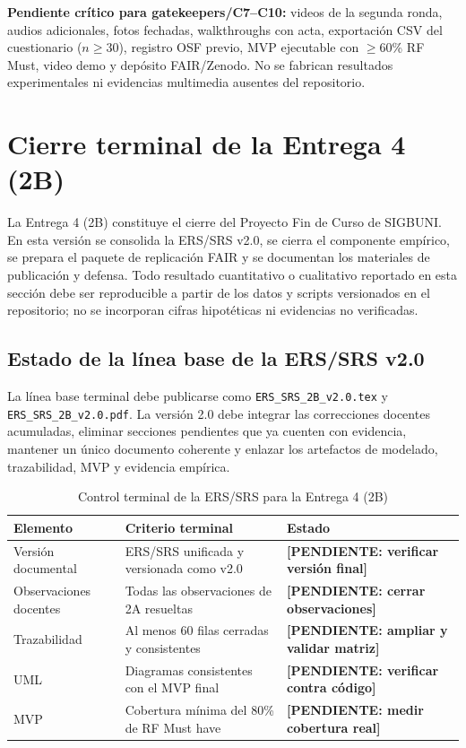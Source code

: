 \documentclass[12pt,journal,onecolumn]{IEEEtran}
\newcommand{\pendiente}[1]{\textcolor{red!70!black}{\textbf{[PENDIENTE: #1]}}}
\begin{document}
\textbf{Pendiente crítico para gatekeepers/C7--C10:} videos de la segunda ronda, audios adicionales, fotos fechadas, walkthroughs con acta, exportación CSV del cuestionario ($n\geq30$), registro OSF previo, MVP ejecutable con $\geq$60\% RF Must, video demo y depósito FAIR/Zenodo. No se fabrican resultados experimentales ni evidencias multimedia ausentes del repositorio.

\section{Cierre terminal de la Entrega 4 (2B)}
\label{sec:cierre2b}

La Entrega 4 (2B) constituye el cierre del Proyecto Fin de Curso de SIGBUNI. 
En esta versión se consolida la ERS/SRS v2.0, se cierra el componente empírico,
se prepara el paquete de replicación FAIR y se documentan los materiales de
publicación y defensa. Todo resultado cuantitativo o cualitativo reportado en
esta sección debe ser reproducible a partir de los datos y scripts versionados
en el repositorio; no se incorporan cifras hipotéticas ni evidencias no
verificadas.

\subsection{Estado de la línea base de la ERS/SRS v2.0}

La línea base terminal debe publicarse como \texttt{ERS\_SRS\_2B\_v2.0.tex} y
\texttt{ERS\_SRS\_2B\_v2.0.pdf}. La versión 2.0 debe integrar las correcciones
docentes acumuladas, eliminar secciones pendientes que ya cuenten con evidencia,
mantener un único documento coherente y enlazar los artefactos de modelado,
trazabilidad, MVP y evidencia empírica.

\begin{table}[H]
\centering
\caption{Control terminal de la ERS/SRS para la Entrega 4 (2B)}
\begin{tabularx}{\textwidth}{P{0.28\textwidth}Y P{0.18\textwidth}}
\toprule
\textbf{Elemento} & \textbf{Criterio terminal} & \textbf{Estado} \\
\midrule
Versión documental & ERS/SRS unificada y versionada como v2.0 & \pendiente{verificar versión final} \\
Observaciones docentes & Todas las observaciones de 2A resueltas & \pendiente{cerrar observaciones} \\
Trazabilidad & Al menos 60 filas cerradas y consistentes & \pendiente{ampliar y validar matriz} \\
UML & Diagramas consistentes con el MVP final & \pendiente{verificar contra código} \\
MVP & Cobertura mínima del 80\% de RF Must have & \pendiente{medir cobertura real} \\
\bottomrule
\end{tabularx}
\end{table}
\end{document}
